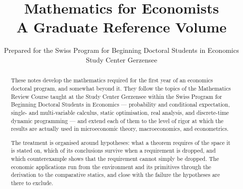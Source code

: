 \documentclass[a4paper]{report}
\author{Prepared for the Swiss Program for Beginning Doctoral Students in Economics\\[0.3em]
	\normalsize Study Center Gerzensee}
\title{\textbf{Mathematics for Economists}\\[0.5em]
	\large A Graduate Reference Volume}
\date{}
\begin{document}
\maketitle

\begin{abstract}
	These notes develop the mathematics required for the first year of an economics
	doctoral program, and somewhat beyond it. They follow the topics of the
	Mathematics Review Course taught at the Study Center Gerzensee within the Swiss
	Program for Beginning Doctoral Students in Economics --- probability and
	conditional expectation, single- and multi-variable calculus, static
	optimisation, real analysis, and discrete-time dynamic programming --- and
	extend each of them to the level of rigor at which the results are actually used
	in microeconomic theory, macroeconomics, and econometrics.

	The treatment is organised around hypotheses: what a theorem requires of the
	space it is stated on, which of its conclusions survive when a requirement is
	dropped, and which counterexample shows that the requirement cannot simply be
	dropped. The economic applications run from the environment and its primitives
	through the derivation to the comparative statics, and close with the failure
	the hypotheses are there to exclude.
\end{abstract}

\newpage



\newpage

\tableofcontents

\newpage
{}

\newpage
\appendix
\appendixpage{}



\newpage
\pagestyle{plain}
\printbibliography[heading=bibintoc,title={Bibliography}]

\printindex[general]
\printindex[notation]
\end{document}
